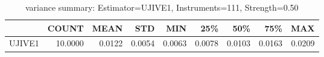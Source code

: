 \begin{table}[ht]
\centering
\caption{variance summary: Estimator=UJIVE1, Instruments=111, Strength=0.50}
\begin{tabular}{lrrrrrrrr}
\toprule
 & COUNT & MEAN & STD & MIN & 25\% & 50\% & 75\% & MAX \\
\midrule
UJIVE1 & 10.0000 & 0.0122 & 0.0054 & 0.0063 & 0.0078 & 0.0103 & 0.0163 & 0.0209 \\
\bottomrule
\end{tabular}
\end{table}
